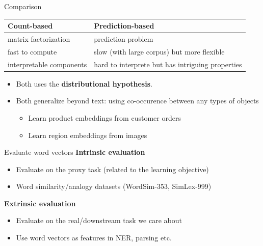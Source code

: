 \documentclass[usenames,dvipsnames,notes,11pt,aspectratio=169]{beamer}
\begin{document}
\begin{frame}
    {Comparison}
    \begin{table}
        \begin{tabular}{p{5cm}p{7cm}}
            Count-based & Prediction-based \\
            \midrule
            matrix factorization & prediction problem \\
            fast to compute & slow (with large corpus) but more flexible \\
            interpretable components & hard to interprete but has intriguing properties
        \end{tabular}

        \begin{itemize}
            \item Both uses the \textbf{distributional hypothesis}.
            \item Both generalize beyond text: using co-occurence between any types of objects
                \begin{itemize}
                    \item Learn product embeddings from customer orders
                    \item Learn region embeddings from images
                \end{itemize}
        \end{itemize}
    \end{table}
\end{frame}

\begin{frame}
    {Evaluate word vectors}
    \textbf{Intrinsic evaluation}\\
    \begin{itemize}
        \item Evaluate on the proxy task (related to the learning objective)
        \item Word similarity/analogy datasets (\eg WordSim-353, SimLex-999)
    \end{itemize}

    \textbf{Extrinsic evaluation}\\
    \begin{itemize}
        \item Evaluate on the real/downstream task we care about
        \item Use word vectors as features in NER, parsing etc.
    \end{itemize}
\end{frame}
\end{document}
